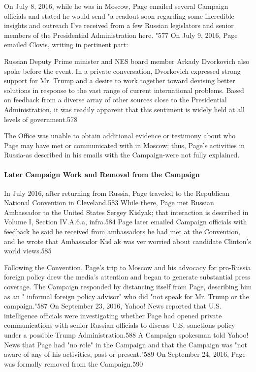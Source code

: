 On July 8, 2016, while he was in Moscow, Page emailed several Campaign officials and stated he would send "a readout soon regarding some incredible insights and outreach I've received from a  few Russian legislators and senior members of the Presidential Administration here. "577 On July 9, 2016, Page emailed Clovis, writing in pertinent part:

Russian Deputy Prime minister and NES board member Arkady Dvorkovich also spoke before the event. In a private conversation, Dvorkovich expressed strong support for Mr. Trump and a  desire to work together toward devising better solutions in response to the vast range of current international problems. Based on feedback from a  diverse array of other sources close to the Presidential Administration, it  was readily apparent that this sentiment is widely held at all levels of government.578

The Office was unable to obtain additional evidence or testimony about who Page may have met or communicated with in Moscow; thus, Page's activities in Russia-as described in his emails with the Campaign-were not fully explained.

\paragraph{Later Campaign Work and Removal from the Campaign}

In July 2016, after returning from Russia, Page traveled to the Republican National Convention in Cleveland.583 While there,  Page met Russian Ambassador to the United States Sergey Kislyak; that interaction is described in Volume I,  Section IV.A.6.a, infra.584 Page later emailed Campaign officials with feedback he said he received from ambassadors he had met at the Convention, and he wrote that Ambassador Kisl ak was ver worried about candidate Clinton's world views.585

Following the Convention, Page's trip to Moscow and his advocacy for pro-Russia foreign policy drew the media's attention and began to generate substantial press coverage. The Campaign responded by distancing itself from Page, describing him as an " informal foreign policy advisor" who did "not speak for Mr. Trump or the campaign."587 On September 23, 2016, Yahoo! News reported that U.S. intelligence officials were investigating whether Page had opened private communications with senior Russian officials to discuss U.S. sanctions policy under a  possible Trump Administration.588 A Campaign spokesman told Yahoo! News that Page had "no role" in the Campaign and that the Campaign was "not aware of any of his activities, past or present."589 On September 24, 2016, Page was formally removed from the Campaign.590

